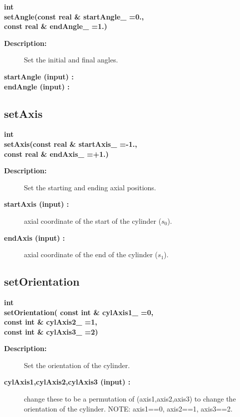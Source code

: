 \begin{flushleft} \textbf{%
int   \\ 
\settowidth{\CylinderMappingIncludeArgIndent}{setAngle(}%
setAngle(const real \& startAngle\_  =0., \\ 
\hspace{\CylinderMappingIncludeArgIndent}const real \& endAngle\_  =1.)
}\end{flushleft}
\begin{description}
\item[{\bf Description:}] 
    Set the initial and final angles.
\item[{\bf startAngle (input) :}]  
\item[{\bf endAngle (input) :}]  
\end{description}
\subsection{setAxis}
 
\begin{flushleft} \textbf{%
int   \\ 
\settowidth{\CylinderMappingIncludeArgIndent}{setAxis(}%
setAxis(const real \& startAxis\_  =-1., \\ 
\hspace{\CylinderMappingIncludeArgIndent}const real \& endAxis\_  =+1.)
}\end{flushleft}
\begin{description}
\item[{\bf Description:}] 
    Set the starting and ending axial positions.
\item[{\bf startAxis (input) :}]  axial coordinate of the start of the cylinder ($s_0$).
\item[{\bf endAxis (input) :}]   axial coordinate of the end of the cylinder ($s_1$).
\end{description}
\subsection{setOrientation}
 
\begin{flushleft} \textbf{%
int   \\ 
\settowidth{\CylinderMappingIncludeArgIndent}{setOrientation(}%
setOrientation( const int \& cylAxis1\_  =0,  \\ 
\hspace{\CylinderMappingIncludeArgIndent}const int \& cylAxis2\_  =1,  \\ 
\hspace{\CylinderMappingIncludeArgIndent}const int \& cylAxis3\_  =2)
}\end{flushleft}
\begin{description}
\item[{\bf Description:}] 
    Set the orientation of the cylinder.
\item[{\bf cylAxis1,cylAxis2,cylAxis3 (input) :}]  change these to be a permutation of (axis1,axis2,axis3) to change
   the orientation of the cylinder. NOTE: axis1==0, axis2==1, axis3==2.
\end{description}
